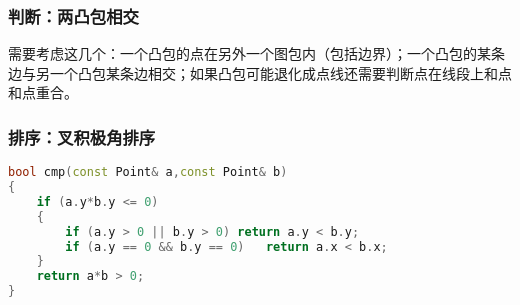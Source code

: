 	\subsubsection{判断：两凸包相交}
		需要考虑这几个：一个凸包的点在另外一个图包内（包括边界）；一个凸包的某条边与另一个凸包某条边相交；如果凸包可能退化成点线还需要判断点在线段上和点和点重合。
		
	\subsubsection{排序：叉积极角排序}
	\begin{lstlisting}[language=c++]
bool cmp(const Point& a,const Point& b)
{
	if (a.y*b.y <= 0)
	{
		if (a.y > 0 || b.y > 0)	return a.y < b.y;
		if (a.y == 0 && b.y == 0)	return a.x < b.x;
	}
	return a*b > 0;
}
	\end{lstlisting}

